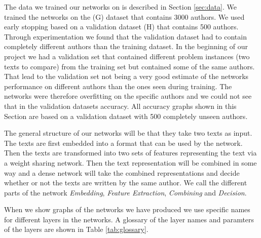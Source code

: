 The data we trained our networks on is described in Section \ref{sec:data}. We
trained the networks on the (G) dataset that contains 3000 authors. We used
early stopping based on a validation dataset (H) that contains 500 authors.
Through experimentation we found that the validation dataset had to contain
completely different authors than the training dataset. In the beginning of
our project we had a validation set that contained different problem instances
(two texts to compare) from the training set but contained some of the same
authors. That lead to the validation set not being a very good estimate of the
networks performance on different authors than the ones seen during training.
The networks were therefore overfitting on the specific authors and we could not
see that in the validation datasets accuracy. All accuracy graphs shown in this
Section are based on a validation dataset with 500 completely unseen authors.

The general structure of our networks will be that they take two texts as input.
The texts are first embedded into a format that can be used by the network.
Then the texts are transformed into two sets of features representing the text
via a weight sharing network. Then the text representation will be combined
in some way and a dense network will take the combined representations and
decide whether or not the texts are written by the same author. We call the
different parts of the network \textit{Embedding}, \textit{Feature Extraction},
\textit{Combining} and \textit{Decision}.

When we show graphs of the networks we have produced we use specific names for
different layers in the networks. A glossary of the layer names and paramters of
the layers are shown in Table \ref{tab:glossary}.

